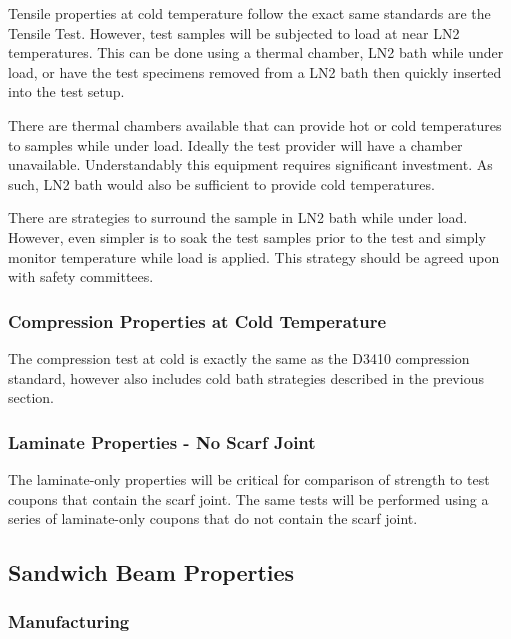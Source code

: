 Tensile properties at cold temperature follow the exact same standards are the Tensile Test.
However, test samples will be subjected to load at near LN2 temperatures. This can be done using
a thermal chamber, LN2 bath while under load, or have the test specimens removed from a LN2
bath then quickly inserted into the test setup.

There are thermal chambers available that can provide hot or cold temperatures to samples while
under load. Ideally the test provider will have a chamber unavailable. Understandably this
equipment requires significant investment. As such, LN2 bath would also be sufficient to provide
cold temperatures.

There are strategies to surround the sample in LN2 bath while under load. However, even simpler
is to soak the test samples prior to the test and simply monitor temperature while load is applied.
This strategy should be agreed upon with safety committees.

\subsubsection{Compression Properties at Cold Temperature}
\label{sec:cryost-proto-compression}

The compression test at cold is exactly the same as the D3410 compression standard, however also includes cold bath strategies described in the previous section.

\subsubsection{Laminate Properties - No Scarf Joint}
\label{sec:cryost-proto-noscarften}

The laminate-only properties will be critical for comparison of strength to test coupons that contain
the scarf joint. The same tests will be performed using a series of laminate-only coupons that do not
contain the scarf joint.

\subsection{Sandwich Beam Properties}
\label{sec:cryost-proto-sandbeam}

\subsubsection{Manufacturing}
\label{sec:cryost-proto-sandbeam-manu}

